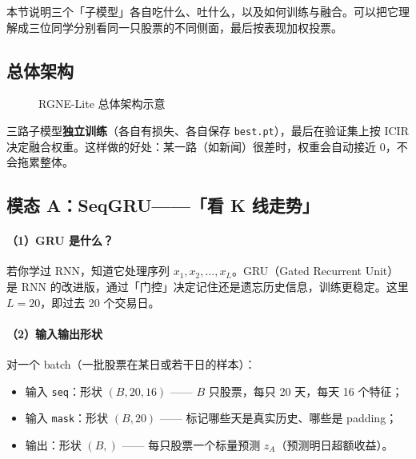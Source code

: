 \documentclass[UTF8,a4paper,12pt]{ctexart}
\begin{document}
本节说明三个「子模型」各自吃什么、吐什么，以及如何训练与融合。可以把它理解成三位同学分别看同一只股票的不同侧面，最后按表现加权投票。

\subsection{总体架构}

\begin{figure}[H]
\centering
{}
\caption{RGNE-Lite 总体架构示意}
\label{fig:arch}
\end{figure}

三路子模型\textbf{独立训练}（各自有损失、各自保存 \texttt{best.pt}），最后在验证集上按 ICIR 决定融合权重。这样做的好处：某一路（如新闻）很差时，权重会自动接近 0，不会拖累整体。

\subsection{模态 A：SeqGRU——「看 K 线走势」}

\paragraph{（1）GRU 是什么？}

若你学过 RNN，知道它处理序列 $x_1,x_2,\ldots,x_L$。GRU（Gated Recurrent Unit）是 RNN 的改进版，通过「门控」决定记住还是遗忘历史信息，训练更稳定。这里 $L=20$，即过去 20 个交易日。

\paragraph{（2）输入输出形状}

对一个 batch（一批股票在某日或若干日的样本）：
\begin{itemize}[leftmargin=2em]
  \item 输入 \texttt{seq}：形状 $(B, 20, 16)$ —— $B$ 只股票，每只 20 天，每天 16 个特征；
  \item 输入 \texttt{mask}：形状 $(B, 20)$ —— 标记哪些天是真实历史、哪些是 padding；
  \item 输出：形状 $(B,)$ —— 每只股票一个标量预测 $z_A$（预测明日超额收益）。
\end{itemize}
\end{document}
